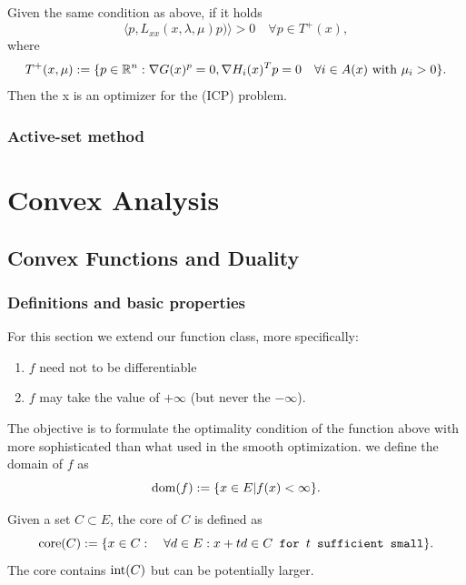 \begin{theorem}
	Given the same condition as above, if it holds
	\begin{equation}
		\langle p, L_{xx}(x, \lambda, \mu) p) \rangle > 0 \quad \forall p \in T^+(x),
	\end{equation}
	where 
	\[
	T^+(x, \mu):= \{ p \in \mathbb{R}^n: \nabla G(x)^p = 0, \nabla H_i(x)^T p = 0 \quad \forall i \in A(x) \text{ with } \mu_i > 0  \}.
	\]
	Then the x is an optimizer for the (ICP) problem.
\end{theorem}

\subsection{Active-set method}



\chapter{Convex Analysis}
\section{Convex Functions and Duality}
\subsection{Definitions and basic properties}
For this section we extend our function class, more specifically:
\begin{enumerate}
	\item $f$ need not to be differentiable
	\item $f$ may take the value of $+ \infty$ (but never the $-\infty$). 
\end{enumerate}

The objective is to formulate the optimality condition of the function above with more sophisticated than what used in the smooth optimization. we define the domain of $f$ as
	\begin{equation}
		\operatorname{dom}(f):= \{ x\in E| f(x) < \infty \}. 
	\end{equation}
    
Given a set $C \subset E$, the core of $C$ is defined as
\begin{equation}
	\operatorname*{core}(C):= \{ x \in C: \quad \forall d \in E: x + td \in C \texttt{ for $t$ sufficient small} \}. 
\end{equation}
The core contains $\operatorname*{int}(C)$ but can be potentially larger.\par

